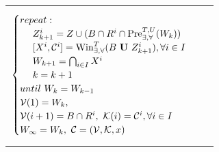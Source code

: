 \begin{table}
\begin{tabular}{ll}
\begin{minipage}{0.5\textwidth}
\begin{align}
\begin{cases}
		{\color{black} repeat:}\\
		\ \ \ \ Z_{k+1}^i = Z\cup (B\cap R^i\cap \text{Pre}_{\exists, \forall}^{T,U}(W_k))\\
		\ \ \ \ [X^i, \mathcal{C}^i]= \text{Win}_{\exists,\forall}^{T} (B\mathbf{\ U\ }Z_{k+1}^i), \forall i \in I\\
		\ \ \ \ W_{k+1} = \bigcap_{i\in I} X^i\\
		\ \ \ \ {\color{black} k=k+1}\\
		{\color{black} until \ W_{k}= W_{k-1} }\\
		\mathcal{V}(1)=W_k,\\ \mathcal{V}(i+1) = B\cap R^i,\ 
		\mathcal{K}(i) = \mathcal{C}^i, \forall i\in I\\
		W_{\infty} = W_k,\ \mathcal{C} = (\mathcal{V},\mathcal{K},x)
		\end{cases}\label{win-interm}
		\end{align}
	\end{minipage} &
\end{tabular} 
\end{table}
